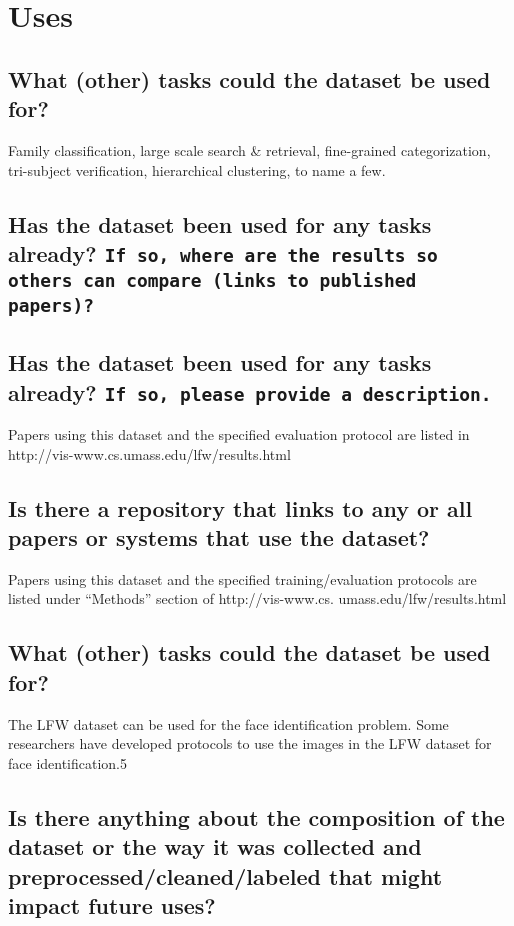 \section*{Uses}
\subsection*{What (other) tasks could the dataset be used for?}
\noindent Family classification, large scale search \& retrieval, fine-grained categorization, tri-subject verification, hierarchical clustering, to name a few.


\subsection*{Has the dataset been used for any tasks already? \texttt{If so, where are the results so others can compare (\eg links to published papers)?}}
\noindent 
\subsection*{Has the dataset been used for any tasks already? \texttt{If so, please provide a description.}}
Papers using this dataset and the specified evaluation protocol are
listed in http://vis-www.cs.umass.edu/lfw/results.html
\subsection*{Is there a repository that links to any or all papers or systems that use the dataset?}
Papers using this dataset and the specified training/evaluation
protocols are listed under “Methods” section of http://vis-www.cs.
umass.edu/lfw/results.html


\subsection*{What (other) tasks could the dataset be used for?}
The LFW dataset can be used for the face identification problem.
Some researchers have developed protocols to use the images in
the LFW dataset for face identification.5


\subsection*{Is there anything about the composition of the dataset or the way it was collected and preprocessed/cleaned/labeled that might impact future uses?}

